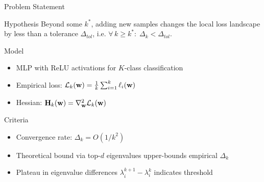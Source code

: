 \documentclass{beamer}
\begin{document}
\begin{frame}{Problem Statement}
    \begin{block}{Hypothesis}
        Beyond some $k^*$, adding new samples changes the local loss landscape by less than a tolerance $\Delta_{tol}$, i.e.
        $\forall\, k \ge k^* : \; \Delta_k < \Delta_{tol}$.
    \end{block}
    \begin{block}{Model}
        \begin{itemize}
            \item MLP with ReLU activations for $K$-class classification
            \item Empirical loss: $\mathcal{L}_k(\mathbf{w}) = \frac1k \sum_{i=1}^k \ell_i(\mathbf{w})$
            \item Hessian: $\mathbf{H}_k(\mathbf{w}) = \nabla^2_{\mathbf{w}} \mathcal{L}_k(\mathbf{w})$
        \end{itemize}
    \end{block}

    \begin{block}{Criteria}
        \begin{itemize}
            \item Convergence rate: $\Delta_k = O(1/k^2)$
            \item Theoretical bound via top-$d$ eigenvalues upper-bounds empirical $\Delta_k$
            \item Plateau in eigenvalue differences $\lambda_i^{k+1}-\lambda_i^k$ indicates threshold
        \end{itemize}
    \end{block}
\end{frame}
\end{document}
